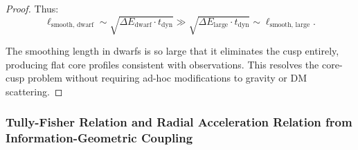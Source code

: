 \begin{theorem}
\begin{proof}
Thus:
\begin{equation}
\ell_{\text{smooth, dwarf}} \sim \sqrt{\Delta E_{\text{dwarf}} \cdot t_{\text{dyn}}} \gg \sqrt{\Delta E_{\text{large}} \cdot t_{\text{dyn}}} \sim \ell_{\text{smooth, large}}.
\end{equation}

The smoothing length in dwarfs is so large that it eliminates the cusp entirely, producing flat core profiles consistent with observations. This resolves the core-cusp problem without requiring ad-hoc modifications to gravity or DM scattering.

\end{proof}

\end{theorem}

\subsubsection{Tully-Fisher Relation and Radial Acceleration Relation from Information-Geometric Coupling}
\label{subsubsec:tullyFisherRAR}

